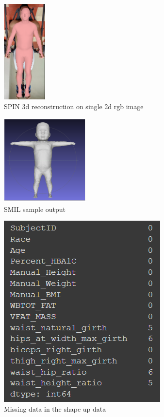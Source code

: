 \begin{figure}[h]
        \caption{SPIN 3d reconstruction on single 2d rgb image}
        \centering
        \includegraphics[width=0.2\textwidth]{images/spin.png}
\end{figure}

\begin{figure}[h]
        \caption{SMIL sample output}
        \centering
        \includegraphics[width=0.4\textwidth]{images/smil.png}
\end{figure}

\begin{figure}[!htb]
        \caption{Missing data in the shape up data}
        \centering
        \includegraphics[]{images/missing_data.png}
\end{figure}

